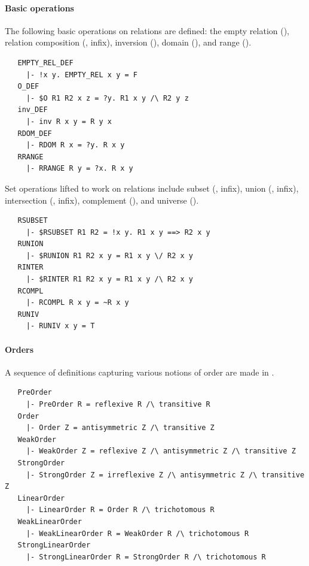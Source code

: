 {\paragraph{Basic operations}

The following basic operations on relations are defined: the empty
relation (), relation composition (,
infix), inversion (), domain (), and range
().
%
\begin{hol}
\begin{verbatim}
   EMPTY_REL_DEF
     |- !x y. EMPTY_REL x y = F
   O_DEF
     |- $O R1 R2 x z = ?y. R1 x y /\ R2 y z
   inv_DEF
     |- inv R x y = R y x
   RDOM_DEF
     |- RDOM R x = ?y. R x y
   RRANGE
     |- RRANGE R y = ?x. R x y
\end{verbatim}
\end{hol}

\noindent Set operations lifted to work on relations include subset
(, infix), union (, infix),
intersection (, infix), complement (),
and universe ().
%
\begin{hol}
\begin{verbatim}
   RSUBSET
     |- $RSUBSET R1 R2 = !x y. R1 x y ==> R2 x y
   RUNION
     |- $RUNION R1 R2 x y = R1 x y \/ R2 x y
   RINTER
     |- $RINTER R1 R2 x y = R1 x y /\ R2 x y
   RCOMPL
     |- RCOMPL R x y = ~R x y
   RUNIV
     |- RUNIV x y = T
\end{verbatim}
\end{hol}

\paragraph {Orders}

A sequence of definitions capturing various notions of order are made
in .
%
\begin{hol}
\begin{verbatim}
   PreOrder
     |- PreOrder R = reflexive R /\ transitive R
   Order
     |- Order Z = antisymmetric Z /\ transitive Z
   WeakOrder
     |- WeakOrder Z = reflexive Z /\ antisymmetric Z /\ transitive Z
   StrongOrder
     |- StrongOrder Z = irreflexive Z /\ antisymmetric Z /\ transitive Z
   LinearOrder
     |- LinearOrder R = Order R /\ trichotomous R
   WeakLinearOrder
     |- WeakLinearOrder R = WeakOrder R /\ trichotomous R
   StrongLinearOrder
     |- StrongLinearOrder R = StrongOrder R /\ trichotomous R
\end{verbatim}
\end{hol}

}
